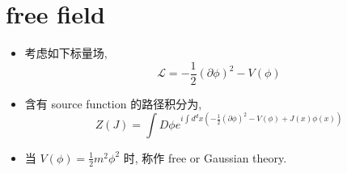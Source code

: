 \chapter{free field}
\begin{itemize}
	\item 考虑如下标量场,
	\begin{equation}
		\mathcal{L} = - \frac{1}{2} (\partial \phi)^2 - V(\phi)
	\end{equation}
	
	\item 含有 source function 的路径积分为,
	\begin{equation}
		Z(J) = \int D\phi e^{i \int d^d x (- \frac{1}{2} (\partial \phi)^2 - V(\phi) + J(x) \phi(x))}
	\end{equation}
	
	\item 当 $V(\phi) = \frac{1}{2} m^2 \phi^2$ 时, 称作 free or Gaussian theory.
\end{itemize}
